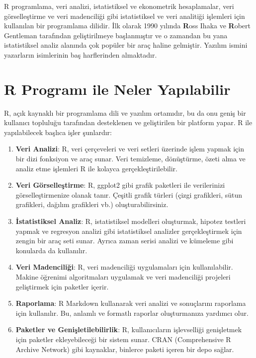 \documentclass[
  letterpaper,
  DIV=11,
  numbers=noendperiod]{scrreprt}
\begin{document}

R programlama, veri analizi, istatistiksel ve ekonometrik hesaplamalar,
veri görselleştirme ve veri madenciliği gibi istatistiksel ve veri
analitiği işlemleri için kullanılan bir programlama dilidir. İlk olarak
1990 yılında \textbf{R}oss Ihaka ve \textbf{R}obert Gentleman tarafından
geliştirilmeye başlanmıştır ve o zamandan bu yana istatistiksel analiz
alanında çok popüler bir araç haline gelmiştir. Yazılım ismini
yazarların isimlerinin baş harflerinden almaktadır.

\section*{R Programı ile Neler
Yapılabilir}\label{r-programux131-ile-neler-yapux131labilir}


R, açık kaynaklı bir programlama dili ve yazılım ortamıdır, bu da onu
geniş bir kullanıcı topluluğu tarafından desteklenen ve geliştirilen bir
platform yapar. R ile yapılabilecek başlıca işler şunlardır:

\begin{enumerate}
\def\labelenumi{\arabic{enumi}.}
\item
  \textbf{Veri Analizi}: R, veri çerçeveleri ve veri setleri üzerinde
  işlem yapmak için bir dizi fonksiyon ve araç sunar. Veri temizleme,
  dönüştürme, özeti alma ve analiz etme işlemleri R ile kolayca
  gerçekleştirilebilir.
\item
  \textbf{Veri Görselleştirme}: R, ggplot2 gibi grafik paketleri ile
  verilerinizi görselleştirmenize olanak tanır. Çeşitli grafik türleri
  (çizgi grafikleri, sütun grafikleri, dağılım grafikleri vb.)
  oluşturabilirsiniz.
\item
  \textbf{İstatistiksel Analiz}: R, istatistiksel modelleri oluşturmak,
  hipotez testleri yapmak ve regresyon analizi gibi istatistiksel
  analizler gerçekleştirmek için zengin bir araç seti sunar. Ayrıca
  zaman serisi analizi ve kümeleme gibi konularda da kullanılır.
\item
  \textbf{Veri Madenciliği}: R, veri madenciliği uygulamaları için
  kullanılabilir. Makine öğrenimi algoritmaları uygulamak ve veri
  madenciliği projeleri geliştirmek için paketler içerir.
\item
  \textbf{Raporlama}: R Markdown kullanarak veri analizi ve sonuçlarını
  raporlama için kullanılır. Bu, anlamlı ve formatlı raporlar
  oluşturmanıza yardımcı olur.
\item
  \textbf{Paketler ve Genişletilebilirlik}: R, kullanıcıların
  işlevselliği genişletmek için paketler ekleyebileceği bir sistem
  sunar. CRAN (Comprehensive R Archive Network) gibi kaynaklar, binlerce
  paketi içeren bir depo sağlar.
\end{enumerate}
\end{document}
